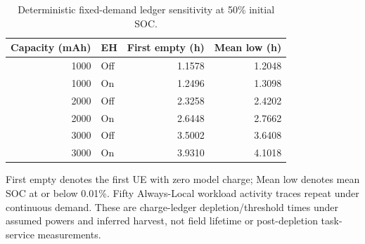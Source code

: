 \begin{table}[t]
\centering\footnotesize
\caption{Deterministic fixed-demand ledger sensitivity at 50\% initial SOC.}
\label{tab:battery}
\begin{tabular}{@{}rlrr@{}}\toprule
Capacity (mAh) & EH & First empty (h) & Mean low (h)\\\midrule
1000 & Off & 1.1578 & 1.2048 \\
1000 & On & 1.2496 & 1.3098 \\
2000 & Off & 2.3258 & 2.4202 \\
2000 & On & 2.6448 & 2.7662 \\
3000 & Off & 3.5002 & 3.6408 \\
3000 & On & 3.9310 & 4.1018 \\
\bottomrule\end{tabular}

\par\smallskip\begin{minipage}{\columnwidth}\footnotesize First empty denotes the first UE with zero model charge; Mean low denotes mean SOC at or below 0.01\%. Fifty Always-Local workload activity traces repeat under continuous demand. These are charge-ledger depletion/threshold times under assumed powers and inferred harvest, not field lifetime or post-depletion task-service measurements.\end{minipage}
\end{table}
